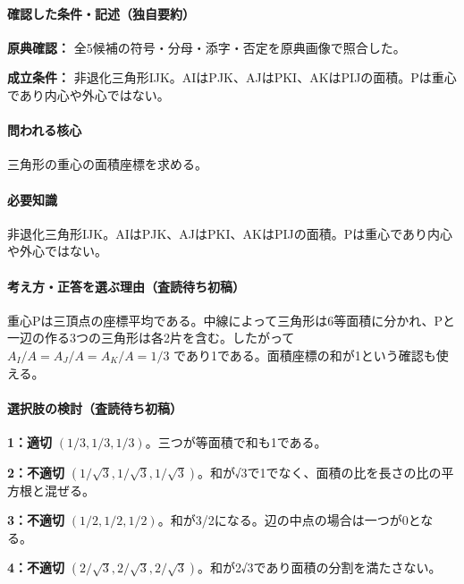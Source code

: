 \paragraph{確認した条件・記述（独自要約）}\mbox{}\par

\noindent\textbf{原典確認：} 全5候補の符号・分母・添字・否定を原典画像で照合した。\par

\noindent\textbf{成立条件：} 非退化三角形IJK。AIはPJK、AJはPKI、AKはPIJの面積。Pは重心であり内心や外心ではない。\par

\paragraph{問われる核心} 三角形の重心の面積座標を求める。

\paragraph{必要知識} 非退化三角形IJK。AIはPJK、AJはPKI、AKはPIJの面積。Pは重心であり内心や外心ではない。

\paragraph{考え方・正答を選ぶ理由（査読待ち初稿）} 重心Pは三頂点の座標平均である。中線によって三角形は6等面積に分かれ、Pと一辺の作る3つの三角形は各2片を含む。したがって \(A_I/A=A_J/A=A_K/A=1/3\) であり1である。面積座標の和が1という確認も使える。

\paragraph{選択肢の検討（査読待ち初稿）}\mbox{}\par

\noindent\textbf{1：適切} \((1/3,1/3,1/3)\)。三つが等面積で和も1である。\par

\noindent\textbf{2：不適切} \((1/\sqrt3,1/\sqrt3,1/\sqrt3)\)。和が√3で1でなく、面積の比を長さの比の平方根と混ぜる。\par

\noindent\textbf{3：不適切} \((1/2,1/2,1/2)\)。和が3/2になる。辺の中点の場合は一つが0となる。\par

\noindent\textbf{4：不適切} \((2/\sqrt3,2/\sqrt3,2/\sqrt3)\)。和が2√3であり面積の分割を満たさない。\par

